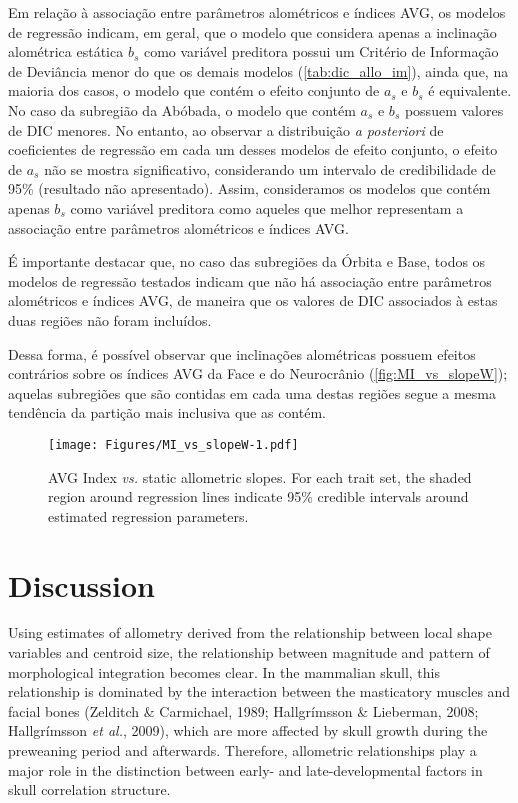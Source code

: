 \documentclass[11pt,twoside]{report}
\begin{document}
Em relação à associação entre parâmetros alométricos e índices AVG, os
modelos de regressão indicam, em geral, que o modelo que considera
apenas a inclinação alométrica estática $b_s$ como variável preditora
possui um Critério de Informação de Deviância menor do que os demais
modelos (\autoref{tab:dic_allo_im}), ainda que, na maioria dos casos, o
modelo que contém o efeito conjunto de $a_s$ e $b_s$ é equivalente. No
caso da subregião da Abóbada, o modelo que contém $a_s$ e $b_s$ possuem
valores de DIC menores. No entanto, ao observar a distribuição \emph{a
posteriori} de coeficientes de regressão em cada um desses modelos de
efeito conjunto, o efeito de $a_s$ não se mostra significativo,
considerando um intervalo de credibilidade de 95\% (resultado não
apresentado). Assim, consideramos os modelos que contém apenas $b_s$
como variável preditora como aqueles que melhor representam a associação
entre parâmetros alométricos e índices AVG.

É importante destacar que, no caso das subregiões da Órbita e Base,
todos os modelos de regressão testados indicam que não há associação
entre parâmetros alométricos e índices AVG, de maneira que os valores de
DIC associados à estas duas regiões não foram incluídos.



Dessa forma, é possível observar que inclinações alométricas possuem
efeitos contrários sobre os índices AVG da Face e do Neurocrânio
(\autoref{fig:MI_vs_slopeW}); aquelas subregiões que são contidas em
cada uma destas regiões segue a mesma tendência da partição mais
inclusiva que as contém.

\begin{figure}[htbp]
\centering
\texttt{[image: Figures/MI\_vs\_slopeW-1.pdf]}
\caption{AVG Index \emph{vs.} static allometric slopes. For each trait
set, the shaded region around regression lines indicate 95\% credible
intervals around estimated regression parameters.
\label{fig:MI_vs_Wslope}}
\end{figure}

\section{Discussion}\label{discussion-1}

Using estimates of allometry derived from the relationship between local
shape variables and centroid size, the relationship between magnitude
and pattern of morphological integration becomes clear. In the mammalian
skull, this relationship is dominated by the interaction between the
masticatory muscles and facial bones (Zelditch \& Carmichael, 1989;
Hallgrímsson \& Lieberman, 2008; Hallgrímsson \emph{et al.}, 2009),
which are more affected by skull growth during the preweaning period and
afterwards. Therefore, allometric relationships play a major role in the
distinction between early- and late-developmental factors in skull
correlation structure.
\end{document}
